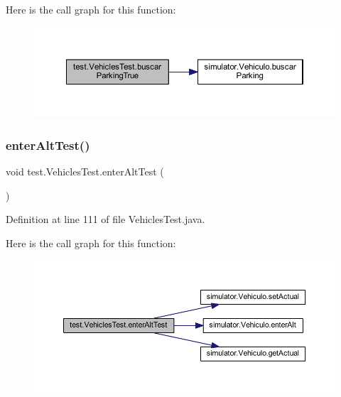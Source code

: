 Here is the call graph for this function\+:\nopagebreak
\begin{figure}[H]
\begin{center}
\leavevmode
\includegraphics[width=350pt]{classtest_1_1_vehicles_test_af769f7022f74eff2bbb9a77f5aea83f8_cgraph}
\end{center}
\end{figure}
\mbox{\label{classtest_1_1_vehicles_test_ab0a8e244c7fbf7141c528356ce18429a}} 
\subsubsection{\texorpdfstring{enter\+Alt\+Test()}{enterAltTest()}}
{\footnotesize\ttfamily void test.\+Vehicles\+Test.\+enter\+Alt\+Test (\begin{DoxyParamCaption}{ }\end{DoxyParamCaption})}



Definition at line 111 of file Vehicles\+Test.\+java.

Here is the call graph for this function\+:\nopagebreak
\begin{figure}[H]
\begin{center}
\leavevmode
\includegraphics[width=350pt]{classtest_1_1_vehicles_test_ab0a8e244c7fbf7141c528356ce18429a_cgraph}
\end{center}
\end{figure}
\mbox{\label{classtest_1_1_vehicles_test_ac7b3dc490a47ed73391a0a95e8b5445c}} 
